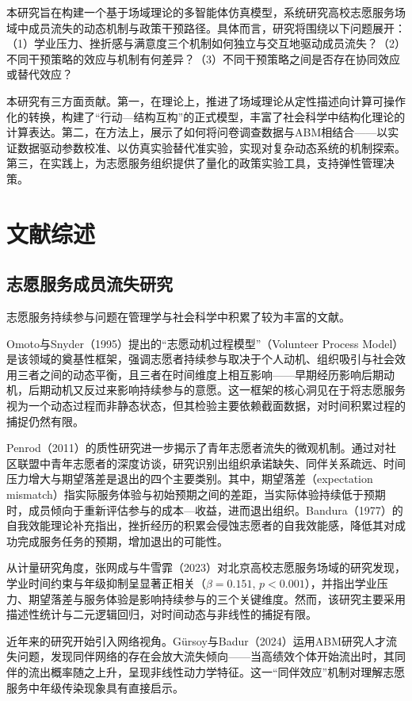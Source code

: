 \documentclass[12pt,a4paper]{article}
\begin{document}
本研究旨在构建一个基于场域理论的多智能体仿真模型，系统研究高校志愿服务场域中成员流失的动态机制与政策干预路径。具体而言，研究将围绕以下问题展开：（1）学业压力、挫折感与满意度三个机制如何独立与交互地驱动成员流失？（2）不同干预策略的效应与机制有何差异？（3）不同干预策略之间是否存在协同效应或替代效应？

本研究有三方面贡献。第一，在理论上，推进了场域理论从定性描述向计算可操作化的转换，构建了“行动—结构互构”的正式模型，丰富了社会科学中结构化理论的计算表达。第二，在方法上，展示了如何将问卷调查数据与ABM相结合——以实证数据驱动参数校准、以仿真实验替代准实验，实现对复杂动态系统的机制探索。第三，在实践上，为志愿服务组织提供了量化的政策实验工具，支持弹性管理决策。

\section{文献综述}

\subsection{志愿服务成员流失研究}

志愿服务持续参与问题在管理学与社会科学中积累了较为丰富的文献。

Omoto与Snyder（1995）提出的“志愿动机过程模型”（Volunteer Process Model）是该领域的奠基性框架，强调志愿者持续参与取决于个人动机、组织吸引与社会效用三者之间的动态平衡，且三者在时间维度上相互影响——早期经历影响后期动机，后期动机又反过来影响持续参与的意愿。这一框架的核心洞见在于将志愿服务视为一个动态过程而非静态状态，但其检验主要依赖截面数据，对时间积累过程的捕捉仍然有限。

Penrod（2011）的质性研究进一步揭示了青年志愿者流失的微观机制。通过对社区联盟中青年志愿者的深度访谈，研究识别出组织承诺缺失、同伴关系疏远、时间压力增大与期望落差是退出的四个主要类别。其中，期望落差（expectation mismatch）指实际服务体验与初始预期之间的差距，当实际体验持续低于预期时，成员倾向于重新评估参与的成本—收益，进而退出组织。Bandura（1977）的自我效能理论补充指出，挫折经历的积累会侵蚀志愿者的自我效能感，降低其对成功完成服务任务的预期，增加退出的可能性。

从计量研究角度，张网成与牛雪霏（2023）对北京高校志愿服务场域的研究发现，学业时间约束与年级抑制呈显著正相关（$\beta = 0.151$, $p < 0.001$），并指出学业压力、期望落差与服务体验是影响持续参与的三个关键维度。然而，该研究主要采用描述性统计与二元逻辑回归，对时间动态与非线性的捕捉有限。

近年来的研究开始引入网络视角。G\"ursoy与Badur（2024）运用ABM研究人才流失问题，发现同伴网络的存在会放大流失倾向——当高绩效个体开始流出时，其同伴的流出概率随之上升，呈现非线性动力学特征。这一“同伴效应”机制对理解志愿服务中年级传染现象具有直接启示。
\end{document}

